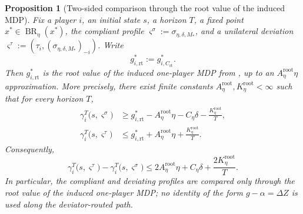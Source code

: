 \documentclass[12pt]{article}
\newtheorem{proposition}[theorem]{Proposition}
\theoremstyle{definition}
\newcommand{\1}{\mathbf{1}}
\DeclareMathOperator{\BR}{BR}
\begin{document}
\begin{proposition}[Two-sided comparison through the root value of the induced MDP]
\label{prop:mdp-direct-comparison}
Fix a player $i$, an initial state $s$, a horizon $T$, a fixed point
$x^*\in\BR_\eta(x^*)$, the compliant profile
$\varsigma^\sigma:=\sigma_{\eta,\delta,M_*}$, and a unilateral deviation
$\varsigma^\tau:=(\tau_i,(\sigma_{\eta,\delta,M_*})_{-i})$. Write
\[
g_{i,\mathrm{rt}}^*:=g_{i,C_{\mathrm{rt}}}^*.
\]
Then $g_{i,\mathrm{rt}}^*$ is the root value of the induced one-player MDP from
, up to an $A_\eta^{\mathrm{root}}\eta$
approximation. More precisely, there exist finite constants
$A_\eta^{\mathrm{root}},K_\eta^{\mathrm{root}}<\infty$ such that for every horizon
$T$,
\begin{align*}
\gamma_i^T\bigl(s,\varsigma^\sigma\bigr)
&\ge
g_{i,\mathrm{rt}}^* - A_\eta^{\mathrm{root}}\eta - C_\eta\delta - \frac{K_\eta^{\mathrm{root}}}{T},
\\
\gamma_i^T\bigl(s,\varsigma^\tau\bigr)
&\le
g_{i,\mathrm{rt}}^* + A_\eta^{\mathrm{root}}\eta + \frac{K_\eta^{\mathrm{root}}}{T}.
\end{align*}
Consequently,
\[
\gamma_i^T\bigl(s,\varsigma^\tau\bigr)
-
\gamma_i^T\bigl(s,\varsigma^\sigma\bigr)
\le
2A_\eta^{\mathrm{root}}\eta + C_\eta\delta + \frac{2K_\eta^{\mathrm{root}}}{T}.
\]
In particular, the compliant and deviating profiles are compared only through the
root value of the induced one-player MDP; no identity of the form
$g-\alpha=\Delta Z$ is used along the deviator-routed path.
\end{proposition}
\end{document}
